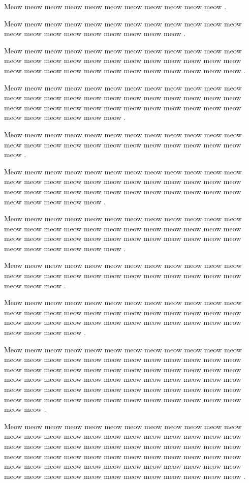 \documentclass[12pt, a5paper, openany]{book}
\begin{document}
Meow meow meow meow meow meow meow meow meow meow meow .

Meow meow meow meow meow meow meow meow meow meow meow meow meow meow meow meow meow meow meow meow meow .

Meow meow meow meow meow meow meow meow meow meow meow meow meow meow meow meow meow meow meow meow meow meow meow meow meow meow meow meow meow meow meow meow meow meow meow meow .

Meow meow meow meow meow meow meow meow meow meow meow meow meow meow meow meow meow meow meow meow meow meow meow meow meow meow meow meow meow meow meow meow meow meow meow meow meow meow meow meow meow meow .

Meow meow meow meow meow meow meow meow meow meow meow meow meow meow meow meow meow meow meow meow meow meow meow meow meow .

Meow meow meow meow meow meow meow meow meow meow meow meow meow meow meow meow meow meow meow meow meow meow meow meow meow meow meow meow meow meow meow meow meow meow meow meow meow meow meow meow meow .

Meow meow meow meow meow meow meow meow meow meow meow meow meow meow meow meow meow meow meow meow meow meow meow meow meow meow meow meow meow meow meow meow meow meow meow meow meow meow meow meow meow meow .

Meow meow meow meow meow meow meow meow meow meow meow meow meow meow meow meow meow meow meow meow meow meow meow meow meow meow meow .

Meow meow meow meow meow meow meow meow meow meow meow meow meow meow meow meow meow meow meow meow meow meow meow meow meow meow meow meow meow meow meow meow meow meow meow meow meow meow meow meow .

Meow meow meow meow meow meow meow meow meow meow meow meow meow meow meow meow meow meow meow meow meow meow meow meow meow meow meow meow meow meow meow meow meow meow meow meow meow meow meow meow meow meow meow meow meow meow meow meow meow meow meow meow meow meow meow meow meow meow meow meow meow meow meow meow meow meow meow meow meow meow meow meow meow meow .

Meow meow meow meow meow meow meow meow meow meow meow meow meow meow meow meow meow meow meow meow meow meow meow meow meow meow meow meow meow meow meow meow meow meow meow meow meow meow meow meow meow meow meow meow meow meow meow meow meow meow meow meow meow meow meow meow meow meow meow meow meow meow meow meow meow meow meow meow meow meow meow meow .
\end{document}
